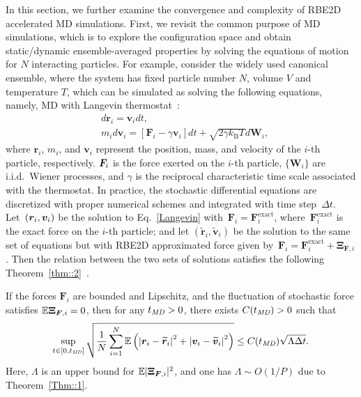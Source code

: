 In this section, we further examine the convergence and complexity of RBE2D accelerated MD simulations. 
First, we revisit the common purpose of MD simulations, which is to explore the configuration space and obtain static/dynamic ensemble-averaged properties by solving the equations of motion for $N$ interacting particles.
For example, consider the widely used canonical ensemble, where the system has fixed particle number $N$, volume $V$ and temperature $T$, which can be simulated as solving the following equations, namely, MD with Langevin thermostat~\cite{frenkel2023understanding}:
\begin{equation}\label{Langevin}
    \begin{aligned}
        & d \bm{r}_i=\bm{v}_i d t, \\
        & m_i d \bm{v}_i=\left[\bm{F}_i-\gamma \bm{v}_i\right] d t+\sqrt{2 \gamma k_{\mathrm{B}} T} d \bm{W}_i,
    \end{aligned}
\end{equation}
where $\bm{r}_i$, $m_i$, and $\bm{v}_i$ represent the position, mass, and velocity of the $i$-th particle, respectively. $\boldsymbol{F}_i$ is the force exerted on the $i$-th particle, $\{\bm{W}_i\}$ are i.i.d.~Wiener processes, and $\gamma$ is the reciprocal characteristic time scale associated with the thermostat.
In practice, the stochastic differential equations are discretized with proper numerical schemes and integrated with time step~$\Delta t$.
Let~$(\boldsymbol{r}_i, \boldsymbol{v}_i)$ be the solution to Eq.~\eqref{Langevin} with~$\bm{F}_i = \bm{F}^{\text{exact}}_i$, where~$\bm{F}^{\text{exact}}_i$ is the exact force on the $i$-th particle; and let $(\widetilde{\bm{r}}_i,\widetilde{\bm{v}}_i)$ be the solution to the same set of equations but with RBE2D approximated force given by~$\bm{F}_i = \bm{F}^{\text{exact}}_i + \bm{\Xi}_{\bm{F},i}$.
Then the relation between the two sets of solutions satisfies the following Theorem~\ref{thm::2}~\cite{jin2021convergence}.

\begin{thm}\label{thm::2}
If the forces $\bm{F}_i$ are bounded and Lipschitz, and the fluctuation of stochastic force satisfies $\mathbb{E}\boldsymbol{\Xi}_{\boldsymbol{F},i}=0$, then for any $t_{\emph{MD}}>0$, there exists $C(t_{\emph{MD}})>0$ such that
\begin{equation}\label{eq::Convergence}
\sup _{t \in[0, t_{\emph{MD}}]} \sqrt{\frac{1}{N} \sum_{i=1}^N \mathbb{E}\left(\left|\bm{r}_i-\widetilde{\bm{r}}_i\right|^2+\left|\bm{v}_i-\widetilde{\bm{v}}_i\right|^2\right)} \leq C(t_{\emph{MD}}) \sqrt{\Lambda \Delta t}. %
\end{equation}
 {Here, $\Lambda$ is an upper bound for $\mathbb{E}|\boldsymbol{\Xi}_{\boldsymbol{F},i}|^2$, and one has $\Lambda\sim O(1/P)$ due to Theorem~\ref{Thm::1}.} 
\end{thm}

